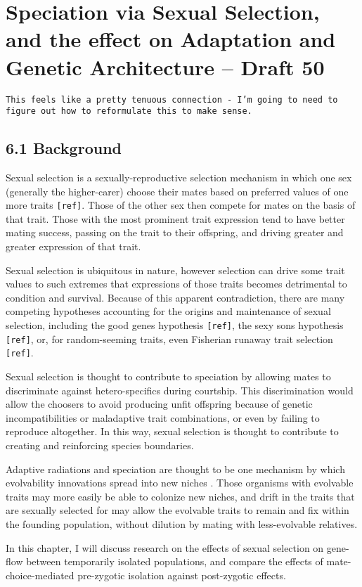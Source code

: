 \section{Speciation via Sexual Selection, and the effect on Adaptation and Genetic Architecture – Draft 50}

\verb|This feels like a pretty tenuous connection - I’m going to need to figure out how to reformulate this to make sense.|

\subsection{6.1 Background}

Sexual selection is a sexually-reproductive selection mechanism in which one sex (generally the higher-carer) choose their mates based on preferred values of one more traits \verb|[ref]|. Those of the other sex then compete for mates on the basis of that trait. Those with the most prominent trait expression tend to have better mating success, passing on the trait to their offspring, and driving greater and greater expression of that trait. 

Sexual selection is ubiquitous in nature, however selection can drive some trait values to such extremes that expressions of those traits becomes detrimental to condition and survival. Because of this apparent contradiction, there are many competing hypotheses accounting for the origins and maintenance of sexual selection, including the good genes hypothesis \verb|[ref]|, the sexy sons hypothesis \verb|[ref]|, or, for random-seeming traits, even Fisherian runaway trait selection \verb|[ref]|. 

Sexual selection is thought to contribute to speciation by allowing mates to discriminate against hetero-specifics during courtship. This discrimination would allow the choosers to avoid producing unfit offspring because of genetic incompatibilities or maladaptive trait combinations, or even by failing to reproduce altogether. In this way, sexual selection is thought to contribute to creating and reinforcing species boundaries.

Adaptive radiations and speciation are thought to be one mechanism by which evolvability innovations spread into new niches \cite{kirschner_evolvability_1998}\cite{dawkins_13_2003}. Those organisms with evolvable traits may more easily be able to colonize new niches, and drift in the traits that are sexually selected for may allow the evolvable traits to remain and fix within the founding population, without dilution by mating with less-evolvable relatives. 

In this chapter, I will discuss research on the effects of sexual selection on gene-flow between temporarily isolated populations, and compare the effects of mate-choice-mediated pre-zygotic isolation against post-zygotic effects.